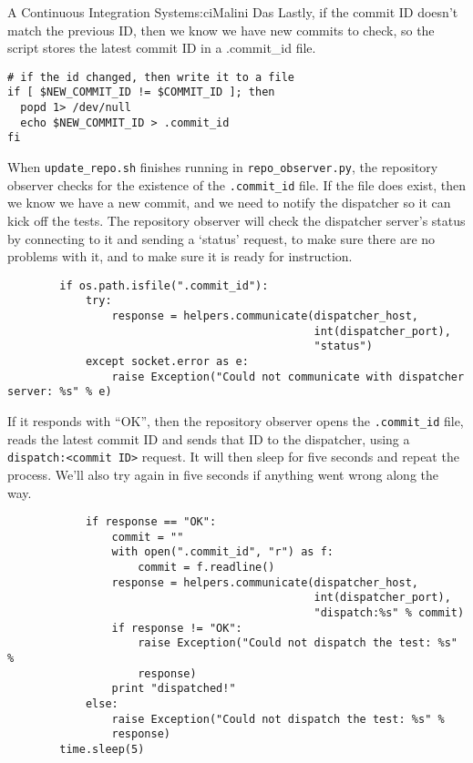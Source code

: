 \begin{aosachapter}{A Continuous Integration System}{s:ci}{Malini Das}
Lastly, if the commit ID doesn't match the previous ID, then we know we
have new commits to check, so the script stores the latest commit ID in
a .commit\_id file.

\begin{verbatim}
# if the id changed, then write it to a file
if [ $NEW_COMMIT_ID != $COMMIT_ID ]; then
  popd 1> /dev/null
  echo $NEW_COMMIT_ID > .commit_id
fi
\end{verbatim}

When \texttt{update\_repo.sh} finishes running in
\texttt{repo\_observer.py}, the repository observer checks for the
existence of the \texttt{.commit\_id} file. If the file does exist, then
we know we have a new commit, and we need to notify the dispatcher so it
can kick off the tests. The repository observer will check the
dispatcher server's status by connecting to it and sending a `status'
request, to make sure there are no problems with it, and to make sure it
is ready for instruction.

\begin{verbatim}
        if os.path.isfile(".commit_id"):
            try:
                response = helpers.communicate(dispatcher_host,
                                               int(dispatcher_port),
                                               "status")
            except socket.error as e:
                raise Exception("Could not communicate with dispatcher server: %s" % e)
\end{verbatim}

If it responds with ``OK'', then the repository observer opens the
\texttt{.commit\_id} file, reads the latest commit ID and sends that ID
to the dispatcher, using a
\texttt{dispatch:\textless{}commit ID\textgreater{}} request. It will
then sleep for five seconds and repeat the process. We'll also try again
in five seconds if anything went wrong along the way.

\begin{verbatim}
            if response == "OK":
                commit = ""
                with open(".commit_id", "r") as f:
                    commit = f.readline()
                response = helpers.communicate(dispatcher_host,
                                               int(dispatcher_port),
                                               "dispatch:%s" % commit)
                if response != "OK":
                    raise Exception("Could not dispatch the test: %s" %
                    response)
                print "dispatched!"
            else:
                raise Exception("Could not dispatch the test: %s" %
                response)
        time.sleep(5)
\end{verbatim}


\end{aosachapter}
